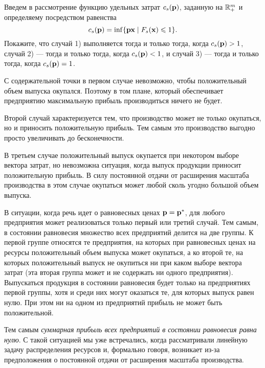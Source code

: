 \begin{exer}
    Введем в рассмотрение функцию удельных затрат $c_{s}(\mathbf{p})$,
    заданную на $\mathbb{R}^{m}_{+}$ и определяему посредством равенства
\[
    c_{s}(\mathbf{p})=\inf\{\mathbf{p}\mathbf{x}\mid F_{s}(\mathbf{x})
    \leqslant 1\}.
\]
    Покажите, что случай 1) выполняется тогда и только тогда, когда
    $c_{s}(\mathbf{p})>1$, случай 2) --- тогда и только тогда, когда
    $c_{s}(\mathbf{p})<1$, и случай 3) --- тогда и только тогда, когда
    $c_{s}(\mathbf{p})=1$.
\end{exer}

    С содержательной точки в первом случае невозможно, чтобы
    положительный объем выпуска окупался.
    Поэтому в том плане, который обеспечивает предприятию
    максимальную прибыль производиться ничего не будет.

    Второй случай характеризуется тем, что производство
    может не только окупаться, но и приносить положительную прибыль.
    Тем самым это производство выгодно просто увеличивать до
    бесконечности.

    В третьем случае
    положительный выпуск окупается при некотором выборе вектора
    затрат, но невозможна ситуация, когда выпуск продукции приносит
    положительную прибыль. В силу постоянной отдачи от расширения
    масштаба производства в этом случае окупаться может любой
    сколь угодно большой объем выпуска.

    В ситуации, когда речь идет о равновесных ценах
    $\mathbf{p}=\mathbf{p^{*}}$, для любого предприятия может реализоваться
    только первый или третий случай. Тем самым, в состоянии равновесия
    множество всех предприятий делится на две группы. К первой
    группе относятся те предприятия, на которых при равновесных
    ценах на ресурсы положительный объем выпуска может окупаться, а
    ко второй те, на которых положительный выпуск не окупиться ни
    при каком выборе вектора затрат (эта вторая группа может и не
    содержать ни одного предприятия). Выпускаться продукция в
    состоянии равновесия будет только на предприятиях первой группы,
    хотя и среди них могут оказаться те, для которых выпуск равен
    нулю. При этом ни на одном из предприятий прибыль не может быть
    положительной.

    Тем самым \emph{суммарная прибыль всех предприятий в
    состоянии равновесия равна нулю}. С такой ситуацией мы уже
    встречались, когда рассматривали линейную задачу распределения
    ресурсов и, формально говоря, возникает из-за предположения о
    постоянной отдачи от расширения масштаба производства.

